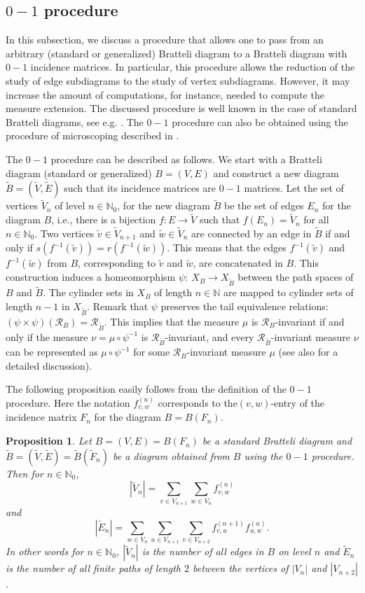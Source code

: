 \documentclass[11pt,reqno]{amsart}
\theoremstyle{definition}
\theoremstyle{remark}
\theoremstyle{plain}
\newtheorem{prop}[definition]{Proposition}
\def\tl{\widetilde}
\newcommand{\N}{\mathbb N}
\newcommand{\mc}{\mathcal}
\numberwithin{equation}{section}
\begin{document}
\subsection{$0-1$ procedure}
In this subsection, we discuss a procedure that allows one to pass from an arbitrary (standard or generalized) Bratteli diagram to a Bratteli diagram with $0-1$ incidence matrices. In particular, this procedure allows the reduction of the study of edge subdiagrams to the study of vertex subdiagrams. However, it may increase the amount of computations, for instance, needed to compute the measure extension. The discussed procedure is well known in the case of standard Bratteli diagrams, see e.g. \cite[Section 5]{Fisher2009}. The $0-1$ procedure can also be obtained using the procedure of microscoping described in \cite[Section 3]{GiordanoPutnamSkau1995}.

The $0-1$ procedure can be described as follows. We start with a Bratteli diagram (standard or generalized) $B = (V, E)$ and construct a new diagram $\tl B  = (\tl V, \tl E)$ such that its incidence matrices are $0-1$ matrices. Let the set of vertices $\tl V_n$ of level $n \in \N_0$, for the new diagram $\tl B$ be the set of edges $E_n$ for the diagram $B$, i.e., there is a bijection $f \colon  E\rightarrow \tl V$ such that $f(E_n) = \tl V_n$ for all $n \in \N_0$. Two vertices $\tl v \in \tl V_{n+1}$ and $\tl w \in \tl V_n$ are connected by an edge in $\tl B$ if and only if $s(f^{-1}(\tl v)) = r(f^{-1}(\tl w))$. This means that the edges $f^{-1}(\tl v)$ and $f^{-1}(\tl w)$ from $B$, corresponding to $\tl v$ and $\tl w$, are concatenated in $B$. This construction induces a homeomorphism $\psi \colon \ X_B\rightarrow X_{\tl B}$ between the path spaces of $B$ and $\tl B$.
The cylinder sets in $X_B$ of length  $n \in \N$ are mapped to cylinder sets of length 
$n - 1$ in $X_{\tl B}$.
Remark that $\psi$ preserves the tail equivalence relations: $(\psi\times \psi) (\mc R_B) = \mc R_{\tl B}$. This implies that the measure $\mu$ is $\mathcal{R}_B$-invariant if and only if the measure $\nu = \mu \circ \psi^{-1}$ is $\mc R_{\tl B}$-invariant, and every $\mc R_{\tl B}$-invariant measure $\nu$ can be represented as $\mu \circ \psi^{-1}$ for some  $\mathcal{R}_B$-invariant measure $\mu$ (see also \cite[Lemma 5.2]{Fisher2009} for a detailed discussion).

The following proposition easily follows from the definition of the $0-1$ procedure. Here the notation $f_{v,w}^{(n)}$ corresponds to the$(v,w)$-entry of the incidence matrix $F_n$ for the diagram $B = B(F_n)$. 
\begin{prop}\label{prop:0-1procedure}
    Let $B = (V,E) = B(F_n)$ be a standard Bratteli diagram and $\tl{B} = (\tl V, \tl E) = \tl B(\tl F_n)$ be a diagram obtained from $B$ using the $0-1$ procedure. Then for $n \in \N_0$,
    $$
    |\tl V_n| = \sum_{v\in V_{n+1}}\sum_{w \in V_n} f_{v,w}^{(n)}
    $$
    and
    $$
    |\tl E_n| = \sum_{w \in V_{n}}\sum_{u \in V_{n+1}}\sum_{v \in V_{n+2}}f^{(n+1)}_{v,u}f^{(n)}_{u,w}.
    $$ 
    In other words for $n \in \N_0$, $|\tl V_n|$ is the number of all edges in $B$ on level $n$ and $\tl E_n$ is the number of all finite paths of length $2$ between the vertices of $|V_n|$ and $|V_{n+2}|$.
\end{prop}
\end{document}
